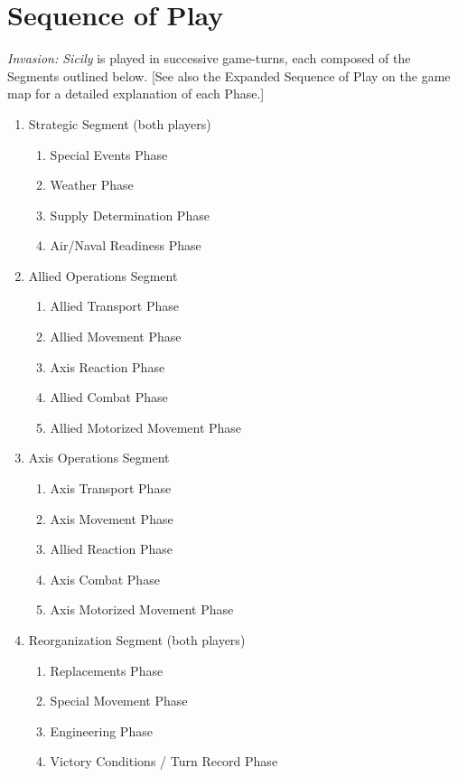 \section{Sequence of Play}
\textit{Invasion: Sicily} is played in successive game-turns, each composed of the Segments outlined below. [See also the Expanded Sequence of Play on the game map for a detailed explanation of each Phase.]

\begin{enumerate}[label=\Alph*.]
    \item Strategic Segment (both players)
    \begin{enumerate}[leftmargin=1em, label=\arabic*.]
        \item Special Events Phase
        \item Weather Phase
        \item Supply Determination Phase
        \item Air/Naval Readiness Phase
    \end{enumerate}
    \item Allied Operations Segment
    \begin{enumerate}[leftmargin=1em, label=\arabic*.]
        \item Allied Transport Phase
        \item Allied Movement Phase
        \item Axis Reaction Phase
        \item Allied Combat Phase
        \item Allied Motorized Movement Phase
    \end{enumerate}
    \item Axis Operations Segment
    \begin{enumerate}[leftmargin=1em, label=\arabic*.]
        \item Axis Transport Phase
        \item Axis Movement Phase
        \item Allied Reaction Phase
        \item Axis Combat Phase
        \item Axis Motorized Movement Phase
    \end{enumerate}
    \item Reorganization Segment (both players)
    \begin{enumerate}[leftmargin=1em, label=\arabic*.]
        \item Replacements Phase
        \item Special Movement Phase
        \item Engineering Phase
        \item Victory Conditions / Turn Record Phase
    \end{enumerate}
\end{enumerate}